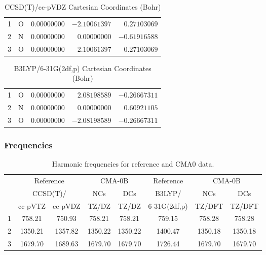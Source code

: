 \documentclass[10pt,oneside]{article}
\begin{document}
\begin{table}[h!]
\centering
\caption{CCSD(T)/cc-pVDZ Cartesian Coordinates (Bohr)}
\begin{tabular}{llrrr}
1  & O  & $ 0.00000000$ & $-2.10061397$ & $ 0.27103069$ \\
2  & N  & $ 0.00000000$ & $ 0.00000000$ & $-0.61916588$ \\
3  & O  & $ 0.00000000$ & $ 2.10061397$ & $ 0.27103069$ \\
\end{tabular}
\end{table}

\begin{table}[h!]
\centering
\caption{B3LYP/6-31G(2df,p) Cartesian Coordinates (Bohr)}
\begin{tabular}{llrrr}
1  & O  & $ 0.00000000$ & $ 2.08198589$ & $-0.26667311$ \\
2  & N  & $ 0.00000000$ & $ 0.00000000$ & $ 0.60921105$ \\
3  & O  & $ 0.00000000$ & $-2.08198589$ & $-0.26667311$ \\
\end{tabular}
\end{table}

\clearpage

\subsubsection*{Frequencies}
\begin{table}[h!]
\centering
\caption{Harmonic frequencies for reference and CMA0 data.}
\begin{tabular}{cccccccc}
\toprule
{} & \multicolumn{2}{c}{Reference} & \multicolumn{2}{c}{CMA-0B} &    Reference & \multicolumn{2}{c}{CMA-0B} \\
{} & \multicolumn{2}{c}{CCSD(T)/} &     NCs &     DCs &       B3LYP/ &     NCs &     DCs \\
{} &   cc-pVTZ & cc-pVDZ &   TZ/DZ &   TZ/DZ & 6-31G(2df,p) &  TZ/DFT &  TZ/DFT \\
\midrule
1 &    758.21 &  750.93 &  758.21 &  758.21 &       759.15 &  758.28 &  758.28 \\
2 &   1350.21 & 1357.82 & 1350.22 & 1350.22 &      1400.47 & 1350.18 & 1350.18 \\
3 &   1679.70 & 1689.63 & 1679.70 & 1679.70 &      1726.44 & 1679.70 & 1679.70 \\
\bottomrule
\end{tabular}
\end{table}
\end{document}
